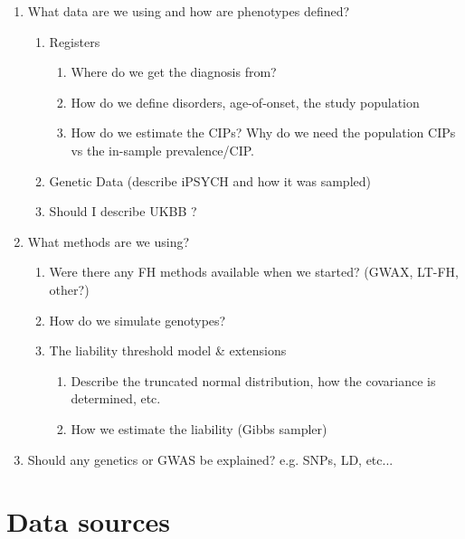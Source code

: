 
\begin{enumerate}
	\item What data are we using and how are phenotypes defined?
		\begin{enumerate}
			\item Registers
			\begin{enumerate}
				\item Where do we get the diagnosis from? 
				\item How do we define disorders, age-of-onset, the study population
				\item How do we estimate the CIPs? Why do we need the population CIPs vs the in-sample prevalence/CIP.
			\end{enumerate}
			\item Genetic Data (describe iPSYCH and how it was sampled)
			\item Should I describe UKBB ?
		\end{enumerate}
	\item What methods are we using?
	\begin{enumerate}
		\item Were there any FH methods available when we started? (GWAX, LT-FH, other?)
		\item How do we simulate genotypes?
		\item The liability threshold model \& extensions
		\begin{enumerate}
			\item Describe the truncated normal distribution, how the covariance is determined, etc.
			\item How we estimate the liability (Gibbs sampler)
		\end{enumerate}
	\end{enumerate} 
	\item Should any genetics or GWAS be explained? e.g. SNPs, LD, etc... 
\end{enumerate}


\section{Data sources}




